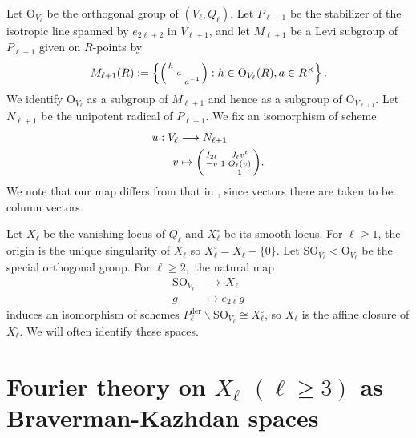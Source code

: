\documentclass[11pt,a4paper,reqno]{amsart}
\theoremstyle{remark}
\numberwithin{equation}{section}
\newcommand{\lto}{\,\longrightarrow\,}
\theoremstyle{definition}
\numberwithin{equation}{section}
\newenvironment{psmatrix}
  {\left(\begin{smallmatrix}}
  {\end{smallmatrix}\right)}
\begin{document}
Let $\mathrm{O}_{V_\ell}$ be the orthogonal group of $(V_\ell,Q_\ell)$. Let $P_{\ell+1}$ be the stabilizer of the isotropic line spanned by $e_{2\ell+2}$ in $V_{\ell+1}$, and let $M_{\ell+1}$ be a Levi subgroup of $P_{\ell+1}$ given on $R$-points by
\begin{align*}
    M_{\ell+1}(R):=\left\{\begin{psmatrix}
        h &  &\\
          & a &\\
          &  & a^{-1}
    \end{psmatrix}: h\in \mathrm{O}_{V_{\ell}}(R), a\in R^\times\right\}.
\end{align*}
We identify $\mathrm{O}_{V_{\ell}}$ as a subgroup of $M_{\ell+1}$ and hence as a subgroup of $\mathrm{O}_{V_{\ell+1}}$. Let $N_{\ell+1}$ be the unipotent radical of $P_{\ell+1}$. We fix an isomorphism of scheme
\begin{align*}
        u:V_{\ell}&\longrightarrow N_{\ell+1}\\
            v    &\mapsto \begin{psmatrix}
                I_{2\ell} & & J_\ell v^t\\
                    -v       &  1 & Q_\ell(v)\\
                         &  & 1
            \end{psmatrix}.
\end{align*}
We note that our map differs from that in \cite[(2.7)]{Getz:Quad}, since vectors there are taken to be column vectors.

Let $X_\ell$ be the vanishing locus of $Q_\ell$ and $X_\ell^\circ$ be its smooth locus. For $\ell\ge 1$, the origin is the unique singularity of $X_\ell$ so  $X_\ell^\circ=X_\ell-\{0\}$. Let $\mathrm{SO}_{V_\ell}<\mathrm{O}_{V_\ell}$ be the special orthogonal group. For $\ell\ge 2,$ the natural map
\begin{align*}
     \mathrm{SO}_{V_\ell}&\lto X_\ell \\
     g &\longmapsto e_{2\ell}g
\end{align*}
induces an isomorphism of schemes $P_\ell^{\mathrm{der}}\backslash \mathrm{SO}_{V_\ell} \cong X_\ell^\circ$, so  $X_{\ell}$ is the affine closure of $X_\ell^\circ$. We will often identify these spaces.



\section{Fourier theory on $X_\ell$ $(\ell\ge 3)$ as Braverman-Kazhdan spaces}\label{sec:BK}
\end{document}
